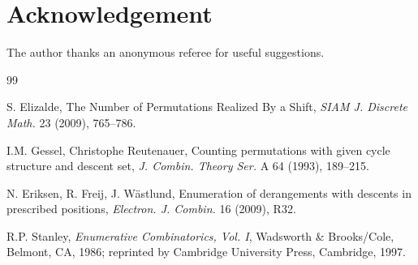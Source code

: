 \documentclass[11pt]{amsart}
\begin{document}
\section*{Acknowledgement}
The author thanks an anonymous referee for useful suggestions.

\begin{thebibliography}{99}

 S. Elizalde, The Number of Permutations Realized By a Shift, {\it SIAM J. Discrete Math.} 23 (2009), 765--786.

 I.M. Gessel, Christophe Reutenauer,
Counting permutations with given cycle structure and descent set, {\it J. Combin. Theory Ser.} A 64 (1993), 189--215.

 N. Eriksen, R. Freij, J. W\"astlund, Enumeration of derangements with descents in prescribed
positions, {\it Electron. J. Combin.} 16 (2009), R32.

 R.P. Stanley, {\it Enumerative Combinatorics, Vol. I}, Wadsworth \& Brooks/Cole, Belmont, CA, 1986; reprinted by
Cambridge University Press, Cambridge, 1997.

\end{thebibliography}
\end{document}
